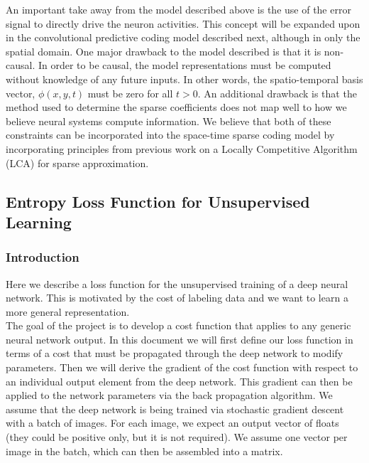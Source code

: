 \documentclass[smallextended]{svjour3}       %
\begin{document}
\noindent An important take away from the model described above is the use of the error signal to directly drive the neuron activities. This concept will be expanded upon in the convolutional predictive coding model described next, although in only the spatial domain. One major drawback to the model described is that it is non-causal. In order to be causal, the model representations must be computed without knowledge of any future inputs. In other words, the spatio-temporal basis vector, $\phi(x,y,t)$ must be zero for all $t > 0$. An additional drawback is that the method used to determine the sparse coefficients does not map well to how we believe neural systems compute information. We believe that both of these constraints can be incorporated into the space-time sparse coding model by incorporating principles from previous work on a Locally Competitive Algorithm (LCA) for sparse approximation.\\


\subsection{Entropy Loss Function for Unsupervised Learning}\label{entropy_loss}
\subsubsection{Introduction} \label{introduction}
\noindent Here we describe a loss function for the unsupervised training of a deep neural network. This is motivated by the cost of labeling data and we want to learn a more general representation.\\

\noindent The goal of the project is to develop a cost function that applies to any generic neural network output. In this document we will first define our loss function in terms of a cost that must be propagated through the deep network to modify parameters. Then we will derive the gradient of the cost function with respect to an individual output element from the deep network. This gradient can then be applied to the network parameters via the back propagation algorithm. We assume that the deep network is being trained via stochastic gradient descent with a batch of images. For each image, we expect an output vector of floats (they could be positive only, but it is not required). We assume one  vector per image in the batch, which can then be assembled into a matrix.
\end{document}

